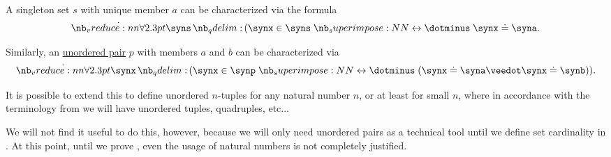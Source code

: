 \begin{remark}\label{rem:unordered_tuples}
  A singleton set \( s \) with unique member \( a \) can be characterized via the formula
  \begin{equation*}
    \qforall \syns (\synx \in \syns \syniff \synx \syneq \syna.
  \end{equation*}

  Similarly, an \hyperref[def:unordered_pair]{unordered pair} \( p \) with members \( a \) and \( b \) can be characterized via
  \begin{equation*}
    \qforall \synx (\synx \in \synp \syniff (\synx \syneq \syna \synvee \synx \syneq \synb)).
  \end{equation*}

  It is possible to extend this to define unordered \( n \)-tuples for any natural number \( n \), or at least for small \( n \), where in accordance with the terminology from  we will have unordered tuples, quadruples, etc...

  We will not find it useful to do this, however, because we will only need unordered pairs as a technical tool until we define set cardinality in . At this point, until we prove , even the usage of natural numbers is not completely justified.
\end{remark}

